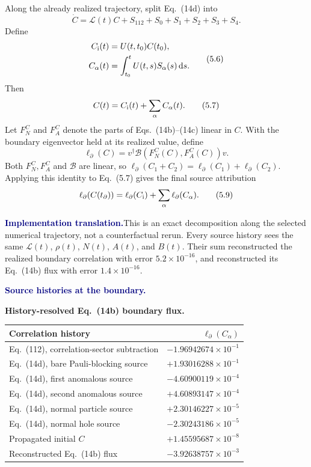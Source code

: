 \documentclass[10pt]{article}
\newcommand{\dd}{\mathrm d}
\newcommand{\LB}{\mathcal B}
\newcommand{\pedbox}[2]{%
  \par\medskip
  \noindent\colorbox{pale}{%
    \parbox{\dimexpr\linewidth-2\fboxsep\relax}{%
      \textcolor{navy}{\textbf{#1}}\quad #2%
    }%
  }\par\medskip
}
\newcommand{\implementationbox}[1]{\pedbox{Implementation translation.}{#1}}
\newcommand{\flowlead}[1]{%
  \par\medskip
  \needspace{3\baselineskip}%
  \noindent\textcolor{navy}{\textbf{#1.}}\enspace\ignorespaces
}
\begin{document}
Along the already realized trajectory, split Eq.~(14d) into
\[
\dot C=\mathcal L(t)C
+S_{112}+S_0+S_1+S_2+S_3+S_4.
\tag{5.5}
\]
Define
\[
\begin{aligned}
C_{\rm i}(t)&=U(t,t_0)C(t_0),\\
C_\alpha(t)&=\int_{t_0}^{t}U(t,s)S_\alpha(s)\,\dd s.
\end{aligned}
\tag{5.6}
\]
Then
\[
C(t)=C_{\rm i}(t)+\sum_\alpha C_\alpha(t).
\tag{5.7}
\]
Let \(F_N^C\) and \(F_A^C\) denote the parts of Eqs.~(14b)--(14c) linear in
\(C\).  With the boundary eigenvector held at its realized value, define
\[
\ell_\partial(C)
=v^\dagger
\LB\!\left(F_N^C(C),F_A^C(C)\right)v.
\tag{5.8}
\]
Both \(F_N^C,F_A^C\) and \(\LB\) are linear, so
\(\ell_\partial(C_1+C_2)=\ell_\partial(C_1)+\ell_\partial(C_2)\).
Applying this identity to Eq.~(5.7) gives the final source attribution
\[
\ell_\partial(C(t_\partial))
=\ell_\partial(C_{\rm i})
+\sum_\alpha\ell_\partial(C_\alpha).
\tag{5.9}
\]

\implementationbox{This is an exact decomposition along the selected
numerical trajectory, not a counterfactual rerun.  Every source history sees
the same \(\mathcal L(t)\), \(\rho(t)\), \(N(t)\), \(A(t)\), and \(B(t)\).
Their sum reconstructed the realized boundary correlation with error
\(5.2\times10^{-16}\), and reconstructed its Eq.~(14b) flux with error
\(1.4\times10^{-16}\).}

\flowlead{Source histories at the boundary}

\begin{center}
\small
\textbf{History-resolved Eq.~(14b) boundary flux.}\par
\smallskip
\begin{tabularx}{\linewidth}{@{}Y r@{}}
\toprule
Correlation history & \(\ell_\partial(C_\alpha)\)\\
\midrule
Eq.~(112), correlation-sector subtraction
& \(-1.96942674\times10^{-1}\)\\
Eq.~(14d), bare Pauli-blocking source
& \(+1.93016288\times10^{-1}\)\\
Eq.~(14d), first anomalous source
& \(-4.60900119\times10^{-4}\)\\
Eq.~(14d), second anomalous source
& \(+4.60893147\times10^{-4}\)\\
Eq.~(14d), normal particle source
& \(+2.30146227\times10^{-5}\)\\
Eq.~(14d), normal hole source
& \(-2.30243186\times10^{-5}\)\\
Propagated initial \(C\)
& \(+1.45595687\times10^{-8}\)\\
\midrule
Reconstructed Eq.~(14b) flux
& \(-3.92638757\times10^{-3}\)\\
\bottomrule
\end{tabularx}
\end{center}
\end{document}
